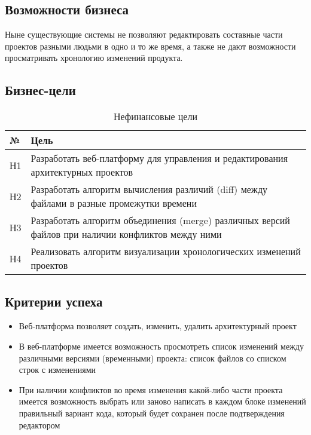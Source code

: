 \documentclass[a4paper,14pt]{extreport} %
\begin{document}
\subsection{Возможности бизнеса}

Ныне существующие системы не позволяют редактировать составные части проектов разными людьми в одно и то же время, а также не дают возможности просматривать хронологию изменений продукта.

\newpage

\subsection{Бизнес-цели}

\begin{table}
\caption {Нефинансовые цели} \label{tab:title}
\begin{center}
\begin{tabular}{ | l | p{14cm} | }
\hline
№ & Цель \\
\hline
Н1 & Разработать веб-платформу для управления и редактирования 	архитектурных проектов \\
\hline
Н2 & Разработать алгоритм вычисления различий (diff) между файлами в разные промежутки времени \\
\hline
Н3 & Разработать алгоритм объединения (merge) различных версий файлов при наличии конфликтов между ними \\
\hline
Н4 & Реализовать алгоритм визуализации хронологических изменений проектов \\
\hline
\end{tabular}
\end{center}
\end{table}
 
 
\subsection{Критерии успеха}

\begin{itemize}
\item Веб-платформа позволяет создать, изменить, удалить архитектурный проект
\item В веб-платформе имеется возможность просмотреть список изменений между различными версиями (временными) проекта: список файлов со списком строк с изменениями
\item При наличии конфликтов во время изменения какой-либо части проекта имеется возможность выбрать или заново написать в каждом блоке изменений правильный вариант кода, который будет сохранен после подтверждения редактором
\end {itemize}
 
\end{document}
